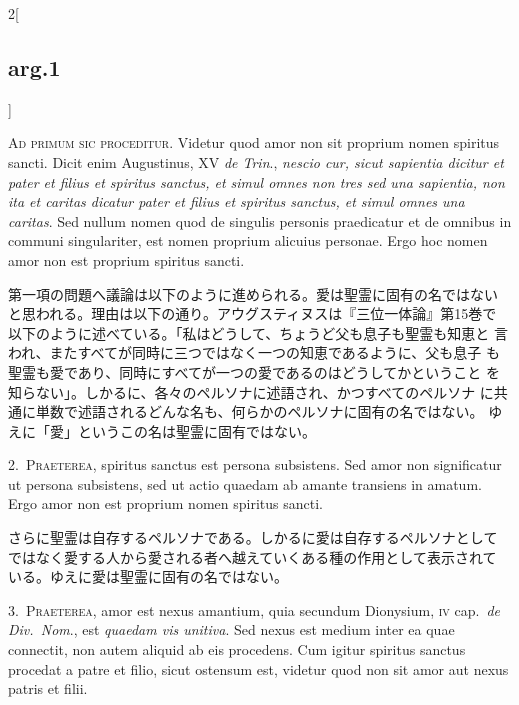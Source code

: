 \documentclass[paper=a4paper,fontsize=10pt,jafontsize=9pt,titlepage]{jlreq}
\begin{document}
\begin{paracol}{2}[\subsection{arg.1}]

{\Large A}{\scshape d primum sic proceditur}. Videtur quod amor non sit proprium nomen
spiritus sancti. Dicit enim Augustinus, XV {\itshape de Trin}., {\itshape nescio cur, sicut
sapientia dicitur et pater et filius et spiritus sanctus, et simul
omnes non tres sed una sapientia, non ita et caritas dicatur pater et
filius et spiritus sanctus, et simul omnes una caritas}. Sed nullum
nomen quod de singulis personis praedicatur et de omnibus in communi
singulariter, est nomen proprium alicuius personae. Ergo hoc nomen
amor non est proprium spiritus sancti.

\switchcolumn

第一項の問題へ議論は以下のように進められる。愛は聖霊に固有の名ではない
と思われる。理由は以下の通り。アウグスティヌスは『三位一体論』第15巻で
以下のように述べている。「私はどうして、ちょうど父も息子も聖霊も知恵と
言われ、またすべてが同時に三つではなく一つの知恵であるように、父も息子
も聖霊も愛であり、同時にすべてが一つの愛であるのはどうしてかということ
を知らない」。しかるに、各々のペルソナに述語され、かつすべてのペルソナ
に共通に単数で述語されるどんな名も、何らかのペルソナに固有の名ではない。
ゆえに「愛」というこの名は聖霊に固有ではない。


2.~{\scshape Praeterea}, spiritus sanctus est persona subsistens. Sed amor non
significatur ut persona subsistens, sed ut actio quaedam ab amante
transiens in amatum. Ergo amor non est proprium nomen spiritus sancti.

\switchcolumn

さらに聖霊は自存するペルソナである。しかるに愛は自存するペルソナとして
ではなく愛する人から愛される者へ越えていくある種の作用として表示されて
いる。ゆえに愛は聖霊に固有の名ではない。


3.~{\scshape Praeterea}, amor est nexus amantium, quia secundum Dionysium, {\scshape iv}
cap.~{\itshape de Div.~Nom}., est {\itshape quaedam vis unitiva}. Sed nexus est medium inter
ea quae connectit, non autem aliquid ab eis procedens. Cum igitur
spiritus sanctus procedat a patre et filio, sicut ostensum est,
videtur quod non sit amor aut nexus patris et filii.


\end{paracol}
\end{document}
